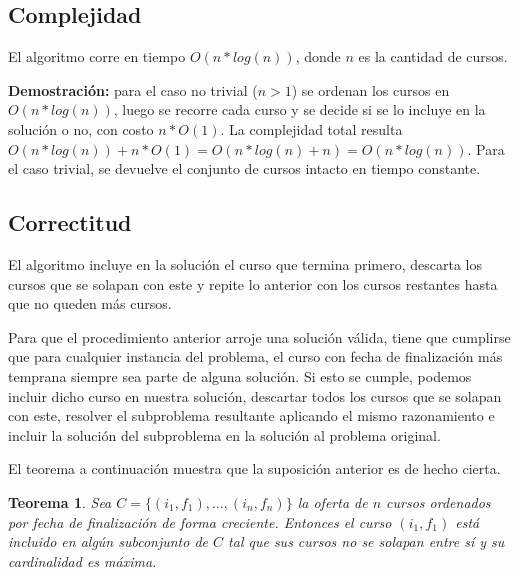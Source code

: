 \documentclass[a4paper, 10pt, twoside]{article}
\begin{document}
\subsection{Complejidad}

El algoritmo corre en tiempo $O(n*log(n))$, donde $n$ es la cantidad de cursos.

\textbf{Demostración:} para el caso no trivial ($n > 1$) se ordenan los cursos en $O(n * log(n))$, luego se recorre cada curso y se decide si se lo incluye en la solución o no, con costo $n * O(1)$. La complejidad total resulta $O(n * log(n)) + n * O(1) = O(n * log(n) + n) = O(n * log(n))$. Para el caso trivial, se devuelve el conjunto de cursos intacto en tiempo constante.


\subsection{Correctitud}

El algoritmo incluye en la solución el curso que termina primero, descarta los cursos que se solapan con este y repite lo anterior con los cursos restantes hasta que no queden más cursos.

Para que el procedimiento anterior arroje una solución válida, tiene que cumplirse que para cualquier instancia del problema, el curso con fecha de finalización más temprana siempre sea parte de alguna solución. Si esto se cumple, podemos incluir dicho curso en nuestra solución, descartar todos los cursos que se solapan con este, resolver el subproblema resultante aplicando el mismo razonamiento e incluir la solución del subproblema en la solución al problema original.

El teorema a continuación muestra que la suposición anterior es de hecho cierta.

\newtheorem*{teorema-ej2}{Teorema}

\begin{teorema-ej2}
    Sea $C = \{ (i_1, f_1), \ldots, (i_n, f_n) \}$ la oferta de $n$ cursos ordenados por fecha de finalización de forma creciente. Entonces el curso $(i_1, f_1)$ está incluido en algún subconjunto de $C$ tal que sus cursos no se solapan entre sí y su cardinalidad es máxima.
\end{teorema-ej2}
\end{document}
